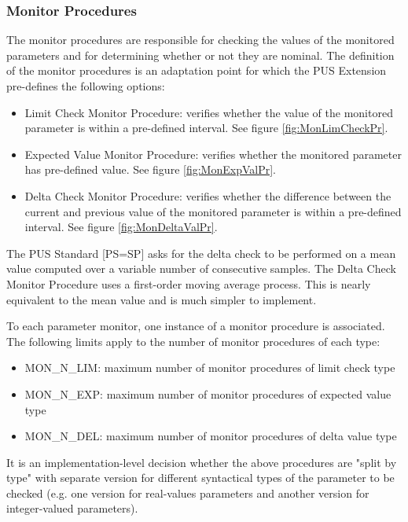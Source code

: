 \documentclass{pnp_article}
\begin{document}
\subsubsection{Monitor Procedures}\label{sec:MonProc}
The monitor procedures are responsible for checking the values of the monitored parameters and for determining whether or not they are nominal. The definition of the monitor procedures is an adaptation point for which the PUS Extension pre-defines the following options:

\begin{itemize}
\item Limit Check Monitor Procedure: verifies whether the value of the monitored parameter is within a pre-defined interval. See figure \ref{fig:MonLimCheckPr}.
\item Expected Value Monitor Procedure: verifies whether the monitored parameter has  pre-defined value. See figure \ref{fig:MonExpValPr}.
\item Delta Check Monitor Procedure: verifies whether the difference between the current and previous value of the monitored parameter is within a pre-defined interval. See figure \ref{fig:MonDeltaValPr}.
\end{itemize}

The PUS Standard [PS=SP] asks for the delta check to be performed on a mean value computed over a variable number of consecutive samples. The Delta Check Monitor Procedure uses a first-order moving average process. This is nearly equivalent to the mean value and is much simpler to implement.

To each parameter monitor, one instance of a monitor procedure is associated. The following limits apply to the number of monitor procedures of each type:

\begin{itemize}
\item MON\_N\_LIM: maximum number of monitor procedures of limit check type
\item MON\_N\_EXP: maximum number of monitor procedures of expected value type
\item MON\_N\_DEL: maximum number of monitor procedures of delta value type
\end{itemize} 

It is an implementation-level decision whether the above procedures are "split by type" with separate version for different syntactical types of the parameter to be checked (e.g. one version for real-values parameters and another version for integer-valued parameters). 
\end{document}
